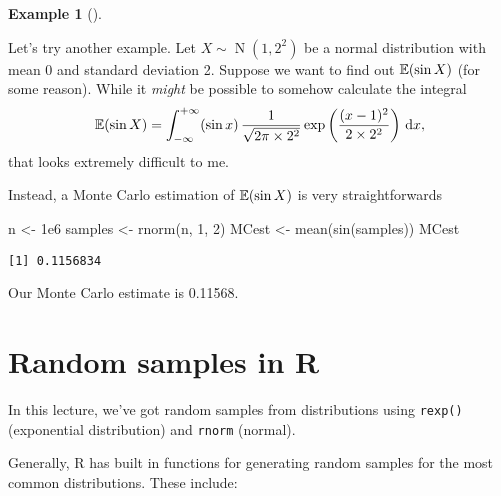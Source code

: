 \documentclass[
  letterpaper,
  DIV=11,
  numbers=noendperiod]{scrreprt}
\newenvironment{Shaded}{\begin{snugshade}}{\end{snugshade}}
\newcommand{\DecValTok}[1]{\textcolor[rgb]{0.68,0.00,0.00}{#1}}
\newcommand{\FloatTok}[1]{\textcolor[rgb]{0.68,0.00,0.00}{#1}}
\newcommand{\FunctionTok}[1]{\textcolor[rgb]{0.28,0.35,0.67}{#1}}
\newcommand{\NormalTok}[1]{\textcolor[rgb]{0.00,0.23,0.31}{#1}}
\newcommand{\OtherTok}[1]{\textcolor[rgb]{0.00,0.23,0.31}{#1}}
\theoremstyle{definition}
\newtheorem{example}{Example}[chapter]
\theoremstyle{definition}
\theoremstyle{remark}
\begin{document}
\begin{example}[]\protect\hypertarget{exm-MC2}{}\label{exm-MC2}

Let's try another example. Let \(X \sim \operatorname{N}(1, 2^2)\) be a
normal distribution with mean 0 and standard deviation 2. Suppose we
want to find out \(\operatorname{\mathbb{E}}(\sin X)\) (for some reason). While it
\emph{might} be possible to somehow calculate the integral
\[ \operatorname{\mathbb{E}}(\sin X) = \int_{-\infty}^{+\infty} (\sin x) \, \frac{1}{\sqrt{2\pi\times 2^2}} \exp\left(\frac{(x - 1)^2}{2\times 2^2}\right) \, \mathrm{d} x , \]
that looks extremely difficult to me.

Instead, a Monte Carlo estimation of \(\operatorname{\mathbb{E}}(\sin X)\) is very
straightforwards

\begin{Shaded}
\begin{Highlighting}[]
\NormalTok{n }\OtherTok{\textless{}{-}} \FloatTok{1e6}
\NormalTok{samples }\OtherTok{\textless{}{-}} \FunctionTok{rnorm}\NormalTok{(n, }\DecValTok{1}\NormalTok{, }\DecValTok{2}\NormalTok{)}
\NormalTok{MCest }\OtherTok{\textless{}{-}} \FunctionTok{mean}\NormalTok{(}\FunctionTok{sin}\NormalTok{(samples))}
\NormalTok{MCest}
\end{Highlighting}
\end{Shaded}

\begin{verbatim}
[1] 0.1156834
\end{verbatim}

Our Monte Carlo estimate is 0.11568.

\end{example}

\section{Random samples in R}\label{random-samples-in-r}

In this lecture, we've got random samples from distributions using
\texttt{rexp()} (exponential distribution) and \texttt{rnorm} (normal).

Generally, R has built in functions for generating random samples for
the most common distributions. These include:
\end{document}
